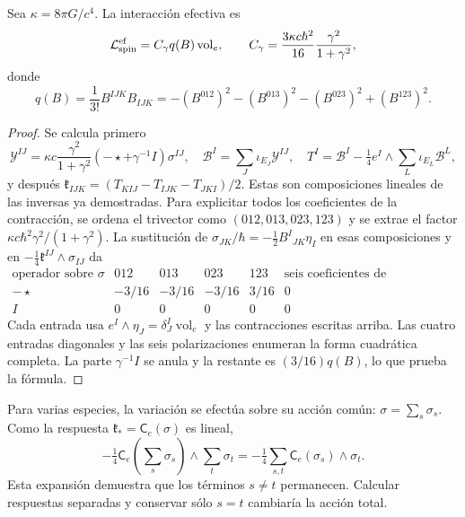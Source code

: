 \begin{theorem}
\label{hmtcuatro:ant:coeficiente}
Sea \(\kappa=8\pi G/c^4\). La interacción efectiva es
\[
 \mathcal L_{\rm spin}^{\rm ef}
 =C_\gamma q(B)\operatorname{vol}_e,\qquad
 C_\gamma=\frac{3\kappa c\hbar^2}{16}
                    \frac{\gamma^2}{1+\gamma^2},
\]
donde
\[
 q(B)=\frac1{3!}B^{IJK}B_{IJK}
 =-(B^{012})^2-(B^{013})^2-(B^{023})^2+(B^{123})^2 .
\]
\end{theorem}
\begin{proof}
Se calcula primero
\[
 \mathcal Y^{IJ}
 =\kappa c\frac{\gamma^2}{1+\gamma^2}
       (-\star+\gamma^{-1}I)\sigma^{IJ},\quad
 \mathcal B^I=\sum_J\iota_{E_J}\mathcal Y^{IJ},\quad
 T^I=\mathcal B^I-\tfrac14e^I\wedge\sum_L\iota_{E_L}\mathcal B^L,
\]
y después
\(\mathfrak k_{IJK}=(T_{KIJ}-T_{IJK}-T_{JKI})/2\).
Estas son composiciones lineales de las inversas ya demostradas.
Para explicitar todos los coeficientes de la contracción, se
ordena el trivector como \((012,013,023,123)\) y se extrae el factor
\(\kappa c\hbar^2\gamma^2/(1+\gamma^2)\). La sustitución de
\(\sigma_{JK}/\hbar=-\frac12B^I{}_{JK}\eta_I\) en esas composiciones
y en \(-\frac14\mathfrak k^{IJ}\wedge\sigma_{IJ}\) da
\[
 \begin{array}{c|rrrr|c}
  \text{operador sobre }\sigma&012&013&023&123&
           \text{seis coeficientes de polarización}\\ \hline
  -\star&-3/16&-3/16&-3/16&3/16&0\\
  I&0&0&0&0&0
 \end{array}
\]
Cada entrada usa \(e^I\wedge\eta_J=\delta_J^I\operatorname{vol}_e\)
y las contracciones escritas arriba. Las cuatro entradas diagonales
y las seis polarizaciones enumeran la forma cuadrática completa.
La parte \(\gamma^{-1}I\) se anula y la restante es
\((3/16)q(B)\), lo que prueba la fórmula.
\end{proof}

Para varias especies, la variación se efectúa sobre su acción
común: \(\sigma=\sum_s\sigma_s\). Como la respuesta
\(\mathfrak k_*=\mathsf C_e(\sigma)\) es lineal,
\begin{equation}
 -\tfrac14\mathsf C_e\!\left(\sum_s\sigma_s\right)
       \wedge\sum_t\sigma_t
 =-\tfrac14\sum_{s,t}\mathsf C_e(\sigma_s)\wedge\sigma_t .
 \label{hmtcuatro:ant:cruces-especies}
\end{equation}
Esta expansión demuestra que los términos \(s\ne t\) permanecen.
Calcular respuestas separadas y conservar sólo \(s=t\) cambiaría
la acción total.

